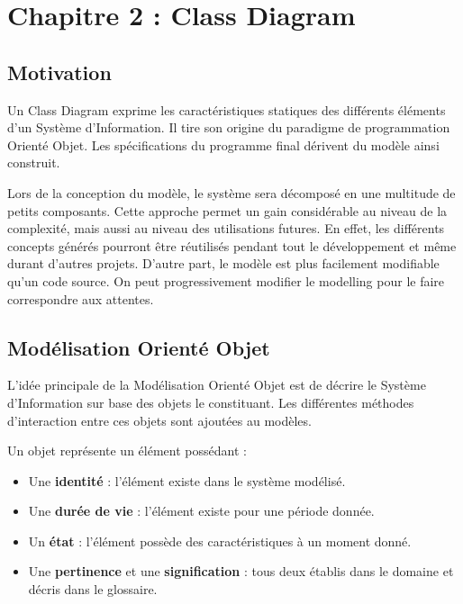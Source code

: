 \documentclass[../Syllabus.tex]{subfiles}
\begin{document}
\section{Chapitre 2 : Class Diagram}

\subsection{Motivation}

Un Class Diagram exprime les caractéristiques statiques des différents éléments d'un Système d'Information. Il tire son origine du paradigme de programmation Orienté Objet. Les spécifications du programme final dérivent du modèle ainsi construit.

Lors de la conception du modèle, le système sera décomposé en une multitude de petits composants. Cette approche permet un gain considérable au niveau de la complexité, mais aussi au niveau des utilisations futures. En effet, les différents concepts générés pourront être réutilisés pendant tout le développement et même durant d'autres projets. D'autre part, le modèle est plus facilement modifiable qu'un code source. On peut progressivement modifier le modelling pour le faire correspondre aux attentes.

\subsection{Modélisation Orienté Objet}

L'idée principale de la Modélisation Orienté Objet est de décrire le Système d'Information sur base des objets le constituant. Les différentes méthodes d'interaction entre ces objets sont ajoutées au modèles.

Un objet représente un élément possédant :

\begin{itemize}
  \item Une \textbf{identité} : l'élément existe dans le système modélisé.
  \item Une \textbf{durée de vie} : l'élément existe pour une période donnée.
  \item Un \textbf{état} : l'élément possède des caractéristiques à un moment donné.
  \item Une \textbf{pertinence} et une \textbf{signification} : tous deux établis dans le domaine et décris dans le glossaire.
\end{itemize}
\end{document}

